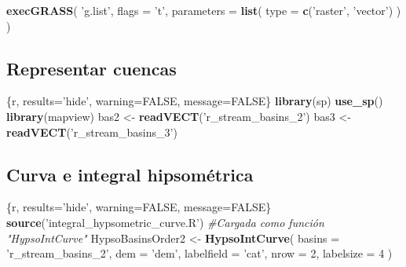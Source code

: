 \documentclass[11pt,]{article}
\newenvironment{Shaded}{\begin{snugshade}}{\end{snugshade}}
\newcommand{\KeywordTok}[1]{\textcolor[rgb]{0.13,0.29,0.53}{\textbf{#1}}}
\newcommand{\DataTypeTok}[1]{\textcolor[rgb]{0.13,0.29,0.53}{#1}}
\newcommand{\DecValTok}[1]{\textcolor[rgb]{0.00,0.00,0.81}{#1}}
\newcommand{\StringTok}[1]{\textcolor[rgb]{0.31,0.60,0.02}{#1}}
\newcommand{\CommentTok}[1]{\textcolor[rgb]{0.56,0.35,0.01}{\textit{#1}}}
\newcommand{\OtherTok}[1]{\textcolor[rgb]{0.56,0.35,0.01}{#1}}
\newcommand{\NormalTok}[1]{#1}
\begin{document}
\begin{Shaded}
\begin{Highlighting}[]
\KeywordTok{execGRASS}\NormalTok{(}
  \StringTok{'g.list'}\NormalTok{,}
  \DataTypeTok{flags =} \StringTok{'t'}\NormalTok{,}
  \DataTypeTok{parameters =} \KeywordTok{list}\NormalTok{(}
    \DataTypeTok{type =} \KeywordTok{c}\NormalTok{(}\StringTok{'raster'}\NormalTok{, }\StringTok{'vector'}\NormalTok{)}
\NormalTok{  )}
\NormalTok{)}
\end{Highlighting}
\end{Shaded}

\subsection{Representar cuencas}\label{representar-cuencas}

\begin{Shaded}
\begin{Highlighting}[]
\NormalTok{    \{r, results=}\StringTok{'hide'}\NormalTok{, warning=}\OtherTok{FALSE}\NormalTok{, message=}\OtherTok{FALSE}\NormalTok{\}}
\KeywordTok{library}\NormalTok{(sp)}
\KeywordTok{use_sp}\NormalTok{()}
\KeywordTok{library}\NormalTok{(mapview)}
\NormalTok{bas2 <-}\StringTok{ }\KeywordTok{readVECT}\NormalTok{(}\StringTok{'r_stream_basins_2'}\NormalTok{)}
\NormalTok{bas3 <-}\StringTok{ }\KeywordTok{readVECT}\NormalTok{(}\StringTok{'r_stream_basins_3'}\NormalTok{)}
\end{Highlighting}
\end{Shaded}

\subsection{Curva e integral
hipsométrica}\label{curva-e-integral-hipsomuxe9trica-1}

\begin{Shaded}
\begin{Highlighting}[]
\NormalTok{    \{r, results=}\StringTok{'hide'}\NormalTok{, warning=}\OtherTok{FALSE}\NormalTok{, message=}\OtherTok{FALSE}\NormalTok{\}}
\KeywordTok{source}\NormalTok{(}\StringTok{'integral_hypsometric_curve.R'}\NormalTok{) }\CommentTok{#Cargada como función "HypsoIntCurve"}
\NormalTok{HypsoBasinsOrder2 <-}\StringTok{ }\KeywordTok{HypsoIntCurve}\NormalTok{(}
  \DataTypeTok{basins =} \StringTok{'r_stream_basins_2'}\NormalTok{,}
  \DataTypeTok{dem =} \StringTok{'dem'}\NormalTok{,}
  \DataTypeTok{labelfield =} \StringTok{'cat'}\NormalTok{,}
  \DataTypeTok{nrow =} \DecValTok{2}\NormalTok{,}
  \DataTypeTok{labelsize =} \DecValTok{4}
\NormalTok{)}
\end{Highlighting}
\end{Shaded}
\end{document}
